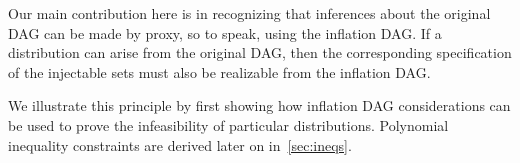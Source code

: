 {Our main contribution here is in recognizing that inferences about the original DAG can be made by proxy, so to speak, using the inflation DAG. If a distribution can arise from the original DAG, then the corresponding specification of the injectable sets must also be realizable from the inflation DAG. 

We illustrate this principle by first showing how inflation DAG considerations can be used to prove the infeasibility of particular distributions. Polynomial inequality constraints are derived later on in~\cref{sec:ineqs}.



\par\smallskip\nobreak

}
